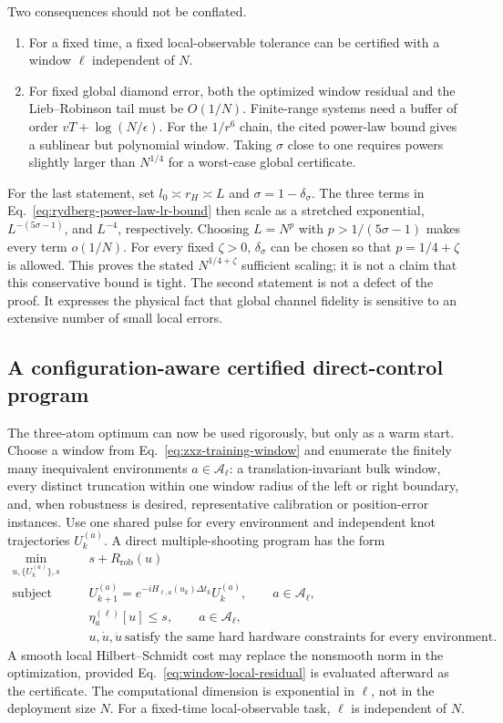 Two consequences should not be conflated.
\begin{enumerate}
\item For a fixed time, a fixed local-observable tolerance can be certified
with a window $\ell$ independent of $N$.
\item For fixed global diamond error, both the optimized window residual and
the Lieb--Robinson tail must be $O(1/N)$.  Finite-range systems need a buffer
of order $vT+\log(N/\epsilon)$.  For the $1/r^6$ chain, the cited power-law
bound gives a sublinear but polynomial window.  Taking $\sigma$ close to one
requires powers slightly larger than $N^{1/4}$ for a worst-case global
certificate.
\end{enumerate}
For the last statement, set $l_0\asymp r_H\asymp L$ and
$\sigma=1-\delta_\sigma$.  The three terms in
Eq.~\eqref{eq:rydberg-power-law-lr-bound} then scale as a stretched
exponential, $L^{-(5\sigma-1)}$, and $L^{-4}$, respectively.  Choosing
$L=N^p$ with $p>1/(5\sigma-1)$ makes every term $o(1/N)$.
For every fixed $\zeta>0$, $\delta_\sigma$ can be chosen so that
$p=1/4+\zeta$ is allowed.  This proves the stated
$N^{1/4+\zeta}$ sufficient scaling; it is not a claim that this conservative
bound is tight.
The second statement is not a defect of the proof.  It expresses the physical
fact that global channel fidelity is sensitive to an extensive number of
small local errors.

\subsection{A configuration-aware certified direct-control program}

The three-atom optimum can now be used rigorously, but only as a warm start.
Choose a window from Eq.~\eqref{eq:zxz-training-window} and enumerate the
finitely many inequivalent environments $a\in\mathcal A_\ell$: a
translation-invariant bulk window, every distinct truncation within one
window radius of the left or right boundary, and, when robustness is desired,
representative calibration or position-error instances.  Use one shared pulse
for every environment and independent knot trajectories $U_k^{(a)}$.  A
direct multiple-shooting program has the form
\begin{align}
\min_{u,\{U_k^{(a)}\},s}
&\quad s+R_{\mathrm{rob}}(u)
\nonumber\\
\text{subject to}
&\quad U_{k+1}^{(a)}
=e^{-iH_{\ell,a}(u_k)\Delta t_k}U_k^{(a)},
\qquad a\in\mathcal A_\ell,
\label{eq:scalable-direct-control-program}\\
&\quad \eta_a^{(\ell)}[u]\leq s,
\qquad a\in\mathcal A_\ell,
\nonumber\\
&\quad u,\dot u,\ddot u\ \text{satisfy the same hard hardware constraints
for every environment}.
\nonumber
\end{align}
A smooth local Hilbert--Schmidt cost
\cite{khatri_2019_quantum,mizuta_2022_local} may replace the nonsmooth norm in
the optimization, provided Eq.~\eqref{eq:window-local-residual} is evaluated
afterward as the certificate.  The computational dimension is exponential in
$\ell$, not in the deployment size $N$.  For a fixed-time local-observable
task, $\ell$ is independent of $N$.

